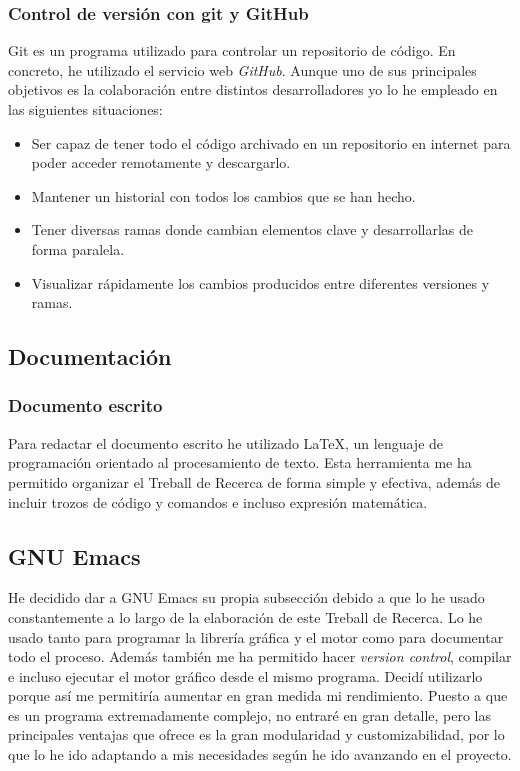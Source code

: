 \documentclass{report}
\begin{document}
\subsubsection{Control de versión con git y GitHub}
Git es un programa utilizado para controlar un repositorio de código. En concreto, he utilizado el servicio web \textit{GitHub}. Aunque uno de sus principales objetivos es la colaboración entre distintos desarrolladores yo lo he empleado en las siguientes situaciones:
\begin{itemize}
\item{Ser capaz de tener todo el código archivado en un repositorio en internet para poder acceder remotamente y descargarlo.}
\item{Mantener un historial con todos los cambios que se han hecho.}
\item{Tener diversas ramas donde cambian elementos clave y desarrollarlas de forma paralela.}
\item{Visualizar rápidamente los cambios producidos entre diferentes versiones y ramas.}
\end{itemize}
\subsection{Documentación}
\subsubsection{Documento escrito}
Para redactar el documento escrito he utilizado \LaTeX, un lenguaje de programación orientado al procesamiento de texto. Esta herramienta me ha permitido organizar el Treball de Recerca de forma simple y efectiva, además de incluir trozos de código y comandos e incluso expresión matemática.
\subsection{GNU Emacs}
He decidido dar a GNU Emacs su propia subsección debido a que lo he usado constantemente a lo largo de la elaboración de este Treball de Recerca. Lo he usado tanto para programar la librería gráfica y el motor como para documentar todo el proceso. Además también me ha permitido hacer \textit{version control}, compilar e incluso ejecutar el motor gráfico desde el mismo programa. Decidí utilizarlo porque así me permitiría aumentar en gran medida mi rendimiento. Puesto a que es un programa extremadamente complejo, no entraré en gran detalle, pero las principales ventajas que ofrece es la gran modularidad y customizabilidad, por lo que lo he ido adaptando a mis necesidades según he ido avanzando en el proyecto.
\end{document}
